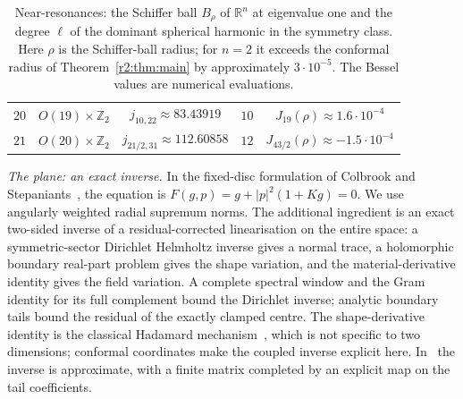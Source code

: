 \documentclass[11pt]{amsart}
\theoremstyle{definition}
\theoremstyle{remark}
\numberwithin{equation}{section}
\newcommand{\R}{\mathbb{R}}
\newcommand{\Z}{\mathbb{Z}}
\begin{document}
\begin{table}[ht]
\begin{tabular}{@{}ccccc@{}}
$20$ & $O(19)\times\Z_2$ & $j_{10,22}\approx83.43919$ & $10$ & $J_{19}(\rho)\approx1.6\cdot10^{-4}$\\
$21$ & $O(20)\times\Z_2$ & $j_{21/2,31}\approx112.60858$ & $12$ & $J_{43/2}(\rho)\approx-1.5\cdot10^{-4}$\\
\bottomrule
\end{tabular}
\caption{Near-resonances: the Schiffer ball $B_\rho$ of $\R^n$ at eigenvalue one and the degree $\ell$ of the dominant spherical harmonic in the symmetry class. Here $\rho$ is the Schiffer-ball radius; for $n=2$ it exceeds the conformal radius of Theorem~\ref{r2:thm:main} by approximately $3\cdot10^{-5}$. The Bessel values are numerical evaluations.}\label{tab:resonances}
\end{table}

\emph{The plane: an exact inverse.} In the fixed-disc formulation of Colbrook and Stepaniants~\cite{CS26}, the equation is $F(g,p)=g+|p|^2(1+Kg)=0$. We use angularly weighted radial supremum norms. The additional ingredient is an exact two-sided inverse of a residual-corrected linearisation on the entire space: a symmetric-sector Dirichlet Helmholtz inverse gives a normal trace, a holomorphic boundary real-part problem gives the shape variation, and the material-derivative identity gives the field variation. A complete spectral window and the Gram identity for its full complement bound the Dirichlet inverse; analytic boundary tails bound the residual of the exactly clamped centre. The shape-derivative identity is the classical Hadamard mechanism~\cite{SZ92,HP18}, which is not specific to two dimensions; conformal coordinates make the coupled inverse explicit here. In~\cite{CS26} the inverse is approximate, with a finite matrix completed by an explicit map on the tail coefficients.
\end{document}
